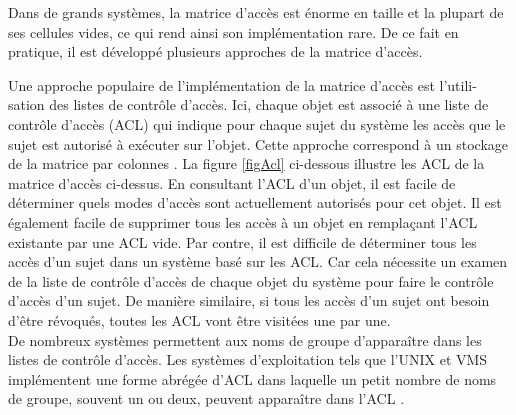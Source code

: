 \label{sectionApproche}

Dans de grands systèmes, la matrice d'accès est énorme en taille et la plupart de ses cellules vides, ce qui rend ainsi son implémentation rare. De ce fait en pratique, il est développé plusieurs approches de la matrice d'accès. 


\label{sectionACL}

Une approche populaire de l'implémentation de la matrice d'accès est l'utili-sation des listes de contrôle d'accès. Ici, chaque objet est associé à une liste de contrôle d'accès (ACL) qui indique pour chaque sujet du système les accès que le sujet est autorisé à exécuter sur l'objet. Cette approche correspond à un stockage de la matrice par colonnes \cite{sandhu94}. La figure \ref{figAcl} ci-dessous illustre les ACL de la matrice d'accès ci-dessus. En consultant l'ACL d'un objet, il est facile de déterminer quels modes d'accès sont actuellement autorisés pour cet objet. Il est également facile de supprimer tous les accès à un objet en remplaçant l'ACL existante par une ACL vide. Par contre, il est difficile de déterminer tous les accès d'un sujet dans un système basé sur les ACL. Car cela nécessite un examen de la liste de contrôle d'accès de chaque objet du système pour faire le contrôle d'accès d'un sujet. De manière similaire, si tous les accès d'un sujet ont besoin d'être révoqués, toutes les ACL vont être visitées une par une. \\
\hspace*{0.5cm} De nombreux systèmes permettent aux noms de groupe d'apparaître dans les listes de contrôle d'accès. Les systèmes d'exploitation tels que l'UNIX et VMS implémentent une forme abrégée d'ACL dans laquelle un petit nombre de noms de groupe, souvent un ou deux, peuvent apparaître dans l'ACL \cite{sandhu94}.

